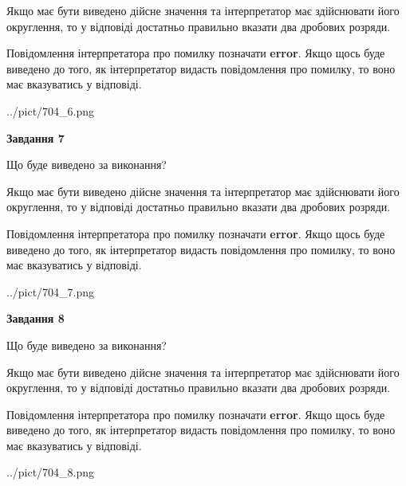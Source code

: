 \documentclass[12pt, ukrainian]{article}
\begin{document}
{\begin {Large}
Якщо має бути виведено дійсне значення та інтерпретатор має здійснювати його округлення, 
то у відповіді достатньо правильно вказати два дробових розряди.

Повідомлення інтерпретатора про помилку позначати \textbf{error}.
Якщо щось буде виведено до того, як інтерпретатор видасть повідомлення про помилку, 
то воно має вказуватись у відповіді. \par

\begin{center}
	{../pict/704_6.png}
\end{center}
\newpage

{\begin {center}\textbf{Завдання 7}\end {center}}\par
Що буде виведено за виконання? \par

Якщо має бути виведено дійсне значення та інтерпретатор має здійснювати його округлення, 
то у відповіді достатньо правильно вказати два дробових розряди.

Повідомлення інтерпретатора про помилку позначати \textbf{error}.
Якщо щось буде виведено до того, як інтерпретатор видасть повідомлення про помилку, 
то воно має вказуватись у відповіді. \par

\begin{center}
	{../pict/704_7.png}
\end{center}
\newpage

{\begin {center}\textbf{Завдання 8}\end {center}}\par
Що буде виведено за виконання? \par

Якщо має бути виведено дійсне значення та інтерпретатор має здійснювати його округлення, 
то у відповіді достатньо правильно вказати два дробових розряди.

Повідомлення інтерпретатора про помилку позначати \textbf{error}.
Якщо щось буде виведено до того, як інтерпретатор видасть повідомлення про помилку, 
то воно має вказуватись у відповіді. \par

\begin{center}
	{../pict/704_8.png}
\end{center}
\newpage


\end{Large}}
\end{document}
